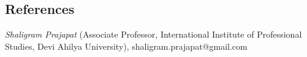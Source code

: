 \documentclass[margin,line]{resume}
\begin{document}
\begin{resume}
    \section{\mysidestyle References} 

    \begin{list2}
    \item {\sl Shaligram Prajapat} (Associate Professor, International Institute of Professional Studies, Devi Ahilya University), shaligram.prajapat@gmail.com
    \end{list2}

\end{resume}
\end{document}
